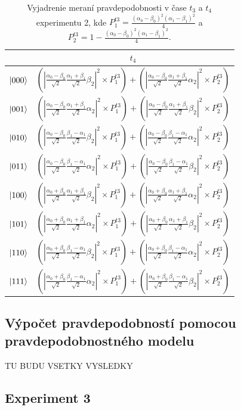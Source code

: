 \begin{table}
\begin{tabular}{|c|c|}
 & \(t_4\) \\
\hline
\(\ket{000}\) &
\((|\frac{\alpha_0 - \beta_0}{\sqrt{2}} \frac{\alpha_1 + \beta_1}{\sqrt{2}} \beta_2|^2 \times P^{t3}_1) + (|\frac{\alpha_0 - \beta_0}{\sqrt{2}} \frac{\alpha_1 + \beta_1}{\sqrt{2}} \alpha_2|^2 \times P^{t3}_2)\)  \\

\(\ket{001}\) & 
\((|\frac{\alpha_0 - \beta_0}{\sqrt{2}} \frac{\alpha_1 + \beta_1}{\sqrt{2}} \alpha_2|^2 \times P^{t3}_1) + (|\frac{\alpha_0 - \beta_0}{\sqrt{2}} \frac{\alpha_1 + \beta_1}{\sqrt{2}} \beta_2|^2 \times P^{t3}_2)\)  \\

\(\ket{010}\) &
\((|\frac{\alpha_0 - \beta_0}{\sqrt{2}} \frac{\beta_1 - \alpha_1}{\sqrt{2}} \beta_2|^2 \times P^{t3}_1) + (|\frac{\alpha_0 - \beta_0}{\sqrt{2}} \frac{\beta_1 - \alpha_1}{\sqrt{2}} \alpha_2|^2 \times P^{t3}_2)\)  \\

\(\ket{011}\) &
\((|\frac{\alpha_0 - \beta_0}{\sqrt{2}} \frac{\beta_1 - \alpha_1}{\sqrt{2}} \alpha_2|^2 \times P^{t3}_1) + (|\frac{\alpha_0 - \beta_0}{\sqrt{2}} \frac{\beta_1 - \alpha_1}{\sqrt{2}} \beta_2|^2 \times P^{t3}_2)\)  \\

\(\ket{100}\) &
\((|\frac{\alpha_0 + \beta_0}{\sqrt{2}} \frac{\alpha_1 + \beta_1}{\sqrt{2}} \beta_2|^2 \times P^{t3}_1) + (|\frac{\alpha_0 + \beta_0}{\sqrt{2}} \frac{\alpha_1 + \beta_1}{\sqrt{2}} \alpha_2|^2 \times P^{t3}_2)\)  \\

\(\ket{101}\) &
\((|\frac{\alpha_0 + \beta_0}{\sqrt{2}} \frac{\alpha_1 + \beta_1}{\sqrt{2}} \alpha_2|^2 \times P^{t3}_1) + (|\frac{\alpha_0 + \beta_0}{\sqrt{2}} \frac{\alpha_1 + \beta_1}{\sqrt{2}} \beta_2|^2 \times P^{t3}_2)\)  \\

\(\ket{110}\) &
\((|\frac{\alpha_0 + \beta_0}{\sqrt{2}} \frac{\beta_1 - \alpha_1}{\sqrt{2}} \beta_2|^2 \times P^{t3}_1) + (|\frac{\alpha_0 + \beta_0}{\sqrt{2}} \frac{\beta_1 - \alpha_1}{\sqrt{2}} \alpha_2|^2 \times P^{t3}_2)\)  \\

\(\ket{111}\) &
\((|\frac{\alpha_0 + \beta_0}{\sqrt{2}} \frac{\beta_1 - \alpha_1}{\sqrt{2}} \alpha_2|^2 \times P^{t3}_1) + (|\frac{\alpha_0 + \beta_0}{\sqrt{2}} \frac{\beta_1 - \alpha_1}{\sqrt{2}} \beta_2|^2 \times P^{t3}_2)\)  \\
\hline

\end{tabular}

\caption{\label{expr2_tanal34} Vyjadrenie meraní pravdepodobnosti v čase 
\(t_3\) a \(t_4\) experimentu 2, kde \(P^{t3}_1 = \frac{(\alpha_0 - \beta_0)^2(\alpha_1 - \beta_1)^2}{4}\) a \(P^{t3}_2 = 1 - \frac{(\alpha_0 - \beta_0)^2(\alpha_1 - \beta_1)^2}{4}\).}
\end{table}

\subsection*{Výpočet pravdepodobností pomocou pravdepodobnostného modelu}
TU BUDU VSETKY VYSLEDKY

\subsection{Experiment 3}

